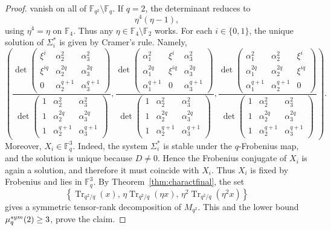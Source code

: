 \documentclass[10pt,a4paper]{amsart}
\def\sym{\textup{sym}}
\begin{document}
\begin{proof}
vanish on all of \(\mathbb F_{q^2}\setminus\mathbb F_q\). If \(q=2\), the determinant reduces to
\[
\eta^4(\eta-1),
\]
using \(\eta^4=\eta\) on \(\mathbb F_4\). Thus any
\(\eta\in\mathbb F_4\setminus\mathbb F_2\) works. For each \(i\in\{0,1\}\), the unique solution of \(\Sigma_i^*\) is given by
Cramer's rule. Namely,
\[\left( \frac{\det\begin{pmatrix}
\xi^i & \alpha_2^2 & \alpha_3^2\\
\xi^{iq} & \alpha_2^{2	q} & \alpha_3^{2q}\\
0 & \alpha_2^{q+1} &  \alpha_3^{q+1}
\end{pmatrix}}{\det\begin{pmatrix}
1 & \alpha_2^2 & \alpha_3^2\\
1 & \alpha_2^{2	q} & \alpha_3^{2q}\\
1 & \alpha_2^{q+1} &  \alpha_3^{q+1}
\end{pmatrix}}, \frac{\det\begin{pmatrix}
\alpha_1^2 & \xi^i & \alpha_3^2\\
\alpha_1^{2	q} & \xi^{iq} & \alpha_3^{2q}\\
\alpha_1^{q+1} & 0 &   \alpha_3^{q+1}
\end{pmatrix}}{\det\begin{pmatrix}
1 & \alpha_2^2 & \alpha_3^2\\
1 & \alpha_2^{2	q} & \alpha_3^{2q}\\
1 & \alpha_2^{q+1} &  \alpha_3^{q+1}
\end{pmatrix}},
\frac{\det\begin{pmatrix}
\alpha_1^2 & \alpha_2^2 & \xi^i \\
\alpha_1^{2	q}  & \alpha_2^{2q}& \xi^{iq}\\
\alpha_1^{q+1}  &   \alpha_2^{q+1} & 0
\end{pmatrix}}{\det\begin{pmatrix}
1 & \alpha_2^2 & \alpha_3^2\\
1 & \alpha_2^{2	q} & \alpha_3^{2q}\\
1 & \alpha_2^{q+1} &  \alpha_3^{q+1}
\end{pmatrix}}
\right).\]
Moreover, \(X_i\in\mathbb F_q^3\). Indeed, the system \(\Sigma_i^*\) is stable under
the \(q\)-Frobenius map, and the solution is unique because \(D\neq 0\). Hence the
Frobenius conjugate of \(X_i\) is again a solution, and therefore it must coincide
with \(X_i\). Thus \(X_i\) is fixed by Frobenius and lies in \(\mathbb F_q^3\). By Theorem~\ref{thm:charactfinal}, the set
\[
\left\{
\operatorname{Tr}_{q^2/q}(x),\,
\eta\operatorname{Tr}_{q^2/q}(\eta x),\,
\eta^2\operatorname{Tr}_{q^2/q}(\eta^2x)
\right\}
\]
gives a symmetric tensor-rank decomposition of \(M_{q^2}\). This and the lower
bound~\(\mu_q^{\sym}(2)\geq 3\), prove the claim.
\end{proof}
\end{document}
